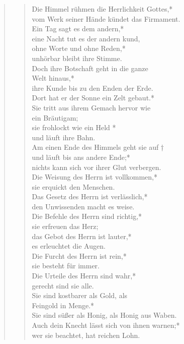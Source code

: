 \begin{quote}
\begin{verse}
\smallskip
Die Himmel rühmen die Herrlichkeit Gottes,*\\
vom Werk seiner Hände kündet das Firmament.\\ \vin
Ein Tag sagt es dem andern,*\\ \vin
eine Nacht tut es der andern kund,\\
ohne Worte und ohne Reden,*\\
unhörbar bleibt ihre Stimme.\\ \vin
Doch ihre Botschaft geht in die ganze\\ \vin  Welt hinaus,*\\ \vin
ihre Kunde bis zu den Enden der Erde.\\
Dort hat er der Sonne ein Zelt gebaut.*\\
Sie tritt aus ihrem Gemach hervor wie\\  ein Bräutigam;\\ \vin
sie frohlockt wie ein Held  * \\ \vin und läuft  ihre Bahn.\\ 
Am einen Ende des Himmels geht sie auf † \\
und läuft bis ans andere Ende;*\\
nichts kann sich vor ihrer Glut verbergen.\\ \vin
Die Weisung des Herrn ist vollkommen,*\\ \vin
sie erquickt den Menschen.\\
Das Gesetz des Herrn ist verlässlich,*\\
den Unwissenden macht es weise.\\ \vin
Die Befehle des Herrn sind richtig,* \\ \vin sie erfreuen das Herz;\\
das Gebot des Herrn ist lauter,* \\es erleuchtet die Augen.\\
\vin Die Furcht des Herrn ist rein,* \\  \vin sie besteht für immer.\\
Die Urteile des Herrn sind wahr,*\\gerecht sind sie alle.\\ \vin
Sie sind kostbarer als Gold, als \\ \vin Feingold in Menge.*\\ \vin
Sie sind süßer als Honig, als Honig aus Waben.\\
Auch dein Knecht lässt sich von ihnen warnen;*\\
wer sie beachtet, hat reichen Lohn.\\ \vin

\end{verse}
\end{quote}
